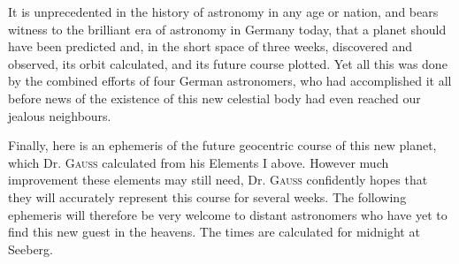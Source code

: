 It is unprecedented in the history of astronomy in any age or nation, and bears witness to the brilliant era of astronomy in Germany today, that a planet should have been predicted and, in the short space of three weeks, discovered and observed, its orbit calculated, and its future course plotted. Yet all this was done by the combined efforts of four German astronomers, who had accomplished it all before news of the existence of this new celestial body had even reached our jealous neighbours.

Finally, here is an ephemeris of the future geocentric course of this new planet, which Dr. \textsc{Gauss} calculated from his Elements I above. However much improvement these elements may still need, Dr. \textsc{Gauss} confidently hopes that they will accurately represent this course for several weeks. The following ephemeris will therefore be very welcome to distant astronomers who have yet to find this new guest in the heavens. The times are calculated for midnight at Seeberg.

